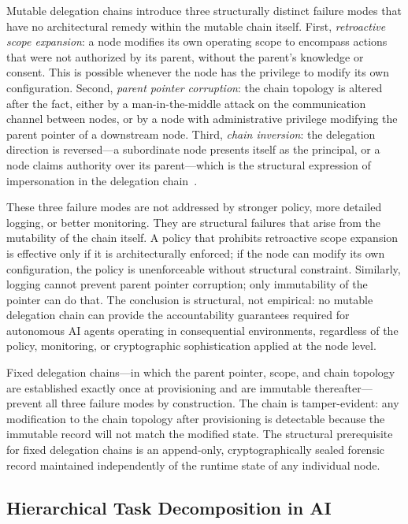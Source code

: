 Mutable delegation chains introduce three structurally distinct failure modes that have no architectural remedy within the mutable chain itself. First, \textit{retroactive scope expansion}: a node modifies its own operating scope to encompass actions that were not authorized by its parent, without the parent's knowledge or consent. This is possible whenever the node has the privilege to modify its own configuration. Second, \textit{parent pointer corruption}: the chain topology is altered after the fact, either by a man-in-the-middle attack on the communication channel between nodes, or by a node with administrative privilege modifying the parent pointer of a downstream node. Third, \textit{chain inversion}: the delegation direction is reversed---a subordinate node presents itself as the principal, or a node claims authority over its parent---which is the structural expression of impersonation in the delegation chain~\cite{agent_delegation_vs_impersonation}.

These three failure modes are not addressed by stronger policy, more detailed logging, or better monitoring. They are structural failures that arise from the mutability of the chain itself. A policy that prohibits retroactive scope expansion is effective only if it is architecturally enforced; if the node can modify its own configuration, the policy is unenforceable without structural constraint. Similarly, logging cannot prevent parent pointer corruption; only immutability of the pointer can do that. The conclusion is structural, not empirical: no mutable delegation chain can provide the accountability guarantees required for autonomous AI agents operating in consequential environments, regardless of the policy, monitoring, or cryptographic sophistication applied at the node level.

Fixed delegation chains---in which the parent pointer, scope, and chain topology are established exactly once at provisioning and are immutable thereafter---prevent all three failure modes by construction. The chain is tamper-evident: any modification to the chain topology after provisioning is detectable because the immutable record will not match the modified state. The structural prerequisite for fixed delegation chains is an append-only, cryptographically sealed forensic record maintained independently of the runtime state of any individual node.

\subsection{Hierarchical Task Decomposition in AI}
\label{sec:rs-task-decomposition}

